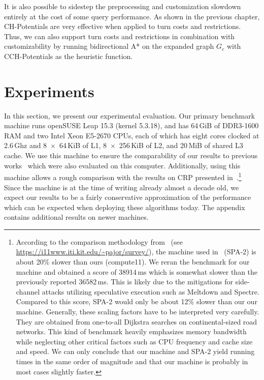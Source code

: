 \documentclass[a4paper, english, cleveref]{lipics-v2021}
\begin{document}
It is also possible to sidestep the preprocessing and customization slowdown entirely at the cost of some query performance.
As shown in the previous chapter, CH-Potentials are very effective when applied to turn costs and restrictions.
Thus, we can also support turn costs and restrictions in combination with customizability by running bidirectional A* on the expanded graph $G_e$ with CCH-Potentials as the heuristic function.

\section{Experiments}
\label{sec:experiments}

In this section, we present our experimental evaluation.
Our primary benchmark machine runs openSUSE Leap 15.3 (kernel 5.3.18), and has 64\,GiB of DDR3-1600 RAM and two Intel Xeon E5-2670 CPUs, each of which has eight cores clocked at 2.6\,Ghz and 8~$\times$~64\,KiB of L1, 8~$\times$~256\,KiB of L2, and 20\,MiB of shared L3 cache.
We use this machine to ensure the comparability of our results to previous works~\cite{DibbeltSW16,BuchholdSW19} which were also evaluated on this computer.
Additionally, using this machine allows a rough comparison with the results on CRP presented in~\cite{DellingGPW17}.\footnote{
According to the comparison methodology from~\cite{BastDGMPSWW16} (see \url{https://i11www.iti.kit.edu/~pajor/survey/}), the machine used in~\cite{DellingGPW17} (SPA-2) is about 20\% slower than ours (compute11).
We reran the benchmark for our machine and obtained a score of 38914\,ms which is somewhat slower than the previously reported 36582\,ms.
This is likely due to the mitigations for side-channel attacks utilizing speculative execution such as Meltdown and Spectre.
Compared to this score, SPA-2 would only be about 12\% slower than our our machine.
Generally, these scaling factors have to be interpreted very carefully.
They are obtained from one-to-all Dijkstra searches on continental-sized road networks.
This kind of benchmark heavily emphasizes memory bandwidth while neglecting other critical factors such as CPU frequency and cache size and speed.
We can only conclude that our machine and SPA-2 yield running times in the same order of magnitude and that our machine is probably in most cases slightly faster.
}
Since the machine is at the time of writing already almost a decade old, we expect our results to be a fairly conservative approximation of the performance which can be expected when deploying these algorithms today.
The appendix contains additional results on newer machines.
\end{document}
